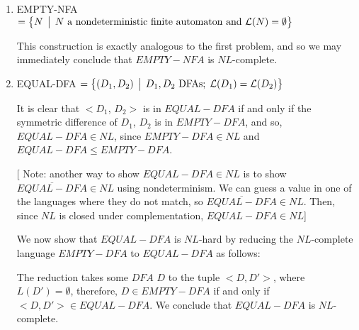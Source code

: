 \documentclass[12pt]{article}
\begin{document}
\begin{enumerate}
\vspace*{.1in}

\item EMPTY-NFA $ = \bigl\{ N \,\bigm|\, N \mbox{ a nondeterministic finite automaton and } {\cal L}(N) =\emptyset \bigr\}$

This construction is exactly analogous to the first problem, and so we may immediately conclude that $EMPTY-NFA$ is $NL$-complete.

\vspace*{.1in}

\item EQUAL-DFA $ =  \bigl\{ (D_1,D_2) \,\bigm|\, D_1,D_2 \mbox{ DFAs};\;{\cal L}(D_1) ={\cal L}(D_2) \bigr\}$

  It is clear that $< D_1$, $D_2 >$ is in $EQUAL-DFA$ if and only if the symmetric difference of $D_1$, $D_2$ is in $EMPTY-DFA$, and so, $EQUAL-DFA \in NL$, since $EMPTY-DFA \in NL$ and $EQUAL-DFA \leq EMPTY-DFA$.

  [{\color{blue} Note: another way to show $EQUAL-DFA \in NL$ is to show $\overline{EQUAL-DFA} \in NL$ using nondeterminism. We can guess a value in one of the languages where they do not match, so $\overline{EQUAL-DFA} \in NL$. Then, since $NL$ is closed under complementation, $EQUAL-DFA \in NL$}]

We now show that $EQUAL-DFA$ is $NL$-hard by reducing the $NL$-complete language $EMPTY-DFA$ to $EQUAL-DFA$ as follows:

The reduction takes some $DFA$ $D$ to the tuple $< D, D'>$, where $L(D') = \emptyset$, therefore, $D \in EMPTY-DFA$ if and only if $<D, D'> \in EQUAL-DFA$. We conclude that $EQUAL-DFA$ is $NL$-complete.

\end{enumerate}
\end{document}
